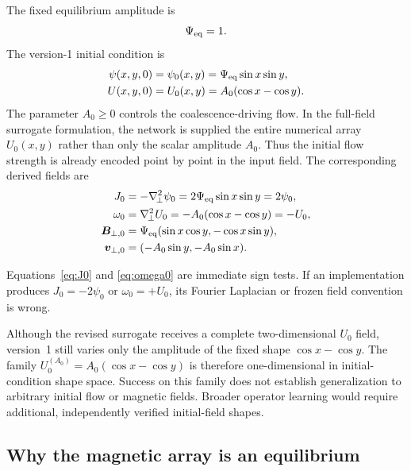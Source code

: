 \documentclass[11pt]{article}
\newcommand{\vect}[1]{\bm{#1}}
\newcommand{\Lap}{\nabla_{\!\perp}^{2}}
\begin{document}
The fixed equilibrium amplitude is
\begin{equation}
\Psi_{\rm eq}=1.
\end{equation}
The version-1 initial condition is
\begin{align}
\psi(x,y,0)
&=\psi_0(x,y)
=\Psi_{\rm eq}\sin x\sin y,
\label{eq:psi0}\\
U(x,y,0)
&=U_0(x,y)
=A_0(\cos x-\cos y).
\label{eq:U0}
\end{align}
The parameter $A_0\ge0$ controls the coalescence-driving flow. In the full-field surrogate formulation, the network is supplied the entire numerical array $U_0(x,y)$ rather than only the scalar amplitude $A_0$. Thus the initial flow strength is already encoded point by point in the input field. The corresponding derived fields are
\begin{align}
J_0
&=-\Lap\psi_0
=2\Psi_{\rm eq}\sin x\sin y
=2\psi_0,
\label{eq:J0}\\
\omega_0
&=\Lap U_0
=-A_0(\cos x-\cos y)
=-U_0,
\label{eq:omega0}\\
\vect{B}_{\perp,0}
&=\Psi_{\rm eq}(\sin x\cos y,-\cos x\sin y),
\label{eq:B0}\\
\vect{v}_{\perp,0}
&=(-A_0\sin y,-A_0\sin x).
\label{eq:v0}
\end{align}

\begin{checkpointbox}
Equations~\eqref{eq:J0} and \eqref{eq:omega0} are immediate sign tests. If an implementation produces $J_0=-2\psi_0$ or $\omega_0=+U_0$, its Fourier Laplacian or frozen field convention is wrong.
\end{checkpointbox}

\begin{warningbox}
Although the revised surrogate receives a complete two-dimensional $U_0$ field, version~1 still varies only the amplitude of the fixed shape $\cos x-\cos y$. The family $U_0^{(A_0)}=A_0(\cos x-\cos y)$ is therefore one-dimensional in initial-condition shape space. Success on this family does not establish generalization to arbitrary initial flow or magnetic fields. Broader operator learning would require additional, independently verified initial-field shapes.
\end{warningbox}

\subsection{Why the magnetic array is an equilibrium}
\end{document}
